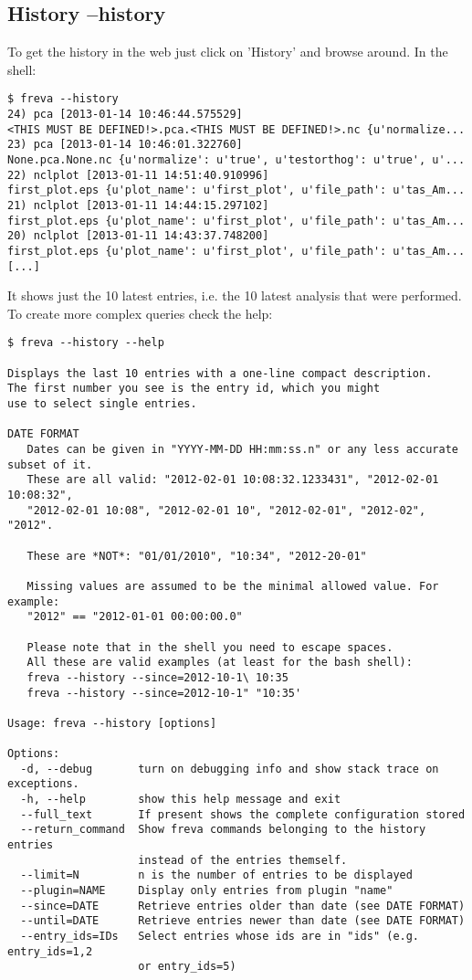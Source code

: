 \documentclass[a4paper,11pt]{ltxdoc}
\begin{document}
\subsection{History --history}
To get the history in the web just click on 'History' and browse around. In the shell:
\begin{verbatim}
$ freva --history
24) pca [2013-01-14 10:46:44.575529] 
<THIS MUST BE DEFINED!>.pca.<THIS MUST BE DEFINED!>.nc {u'normalize...
23) pca [2013-01-14 10:46:01.322760] 
None.pca.None.nc {u'normalize': u'true', u'testorthog': u'true', u'...
22) nclplot [2013-01-11 14:51:40.910996] 
first_plot.eps {u'plot_name': u'first_plot', u'file_path': u'tas_Am...
21) nclplot [2013-01-11 14:44:15.297102] 
first_plot.eps {u'plot_name': u'first_plot', u'file_path': u'tas_Am...
20) nclplot [2013-01-11 14:43:37.748200] 
first_plot.eps {u'plot_name': u'first_plot', u'file_path': u'tas_Am...
[...]
\end{verbatim}
It shows just the 10 latest entries, i.e. the 10 latest analysis that were performed. To create more complex queries check the help:
\begin{verbatim}
$ freva --history --help

Displays the last 10 entries with a one-line compact description.
The first number you see is the entry id, which you might 
use to select single entries.

DATE FORMAT
   Dates can be given in "YYYY-MM-DD HH:mm:ss.n" or any less accurate subset of it.
   These are all valid: "2012-02-01 10:08:32.1233431", "2012-02-01 10:08:32",
   "2012-02-01 10:08", "2012-02-01 10", "2012-02-01", "2012-02", "2012".

   These are *NOT*: "01/01/2010", "10:34", "2012-20-01" 

   Missing values are assumed to be the minimal allowed value. For example:
   "2012" == "2012-01-01 00:00:00.0" 

   Please note that in the shell you need to escape spaces. 
   All these are valid examples (at least for the bash shell):    
   freva --history --since=2012-10-1\ 10:35
   freva --history --since=2012-10-1" "10:35'

Usage: freva --history [options]

Options:
  -d, --debug       turn on debugging info and show stack trace on exceptions.
  -h, --help        show this help message and exit
  --full_text       If present shows the complete configuration stored
  --return_command  Show freva commands belonging to the history entries
                    instead of the entries themself.
  --limit=N         n is the number of entries to be displayed
  --plugin=NAME     Display only entries from plugin "name" 
  --since=DATE      Retrieve entries older than date (see DATE FORMAT)
  --until=DATE      Retrieve entries newer than date (see DATE FORMAT)
  --entry_ids=IDs   Select entries whose ids are in "ids" (e.g. entry_ids=1,2
                    or entry_ids=5)
\end{verbatim}
\end{document}
